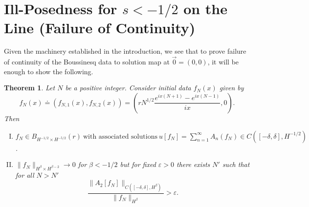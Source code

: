 \documentclass[12pt,reqno]{amsart}
\numberwithin{equation}{section}  %
\newcommand{\ee}{\varepsilon}
\newtheorem{theorem}{Theorem}[section]
\begin{document}
\section{Ill-Posedness for $s < -1/2$ on the Line (Failure of Continuity)} 
Given the machinery established in the introduction, we see that to prove failure of continuity of the Boussinesq data to solution map at $\vec{0} =
(0, 0)$, it will be enough to show the
following.
%
%
%
%
%
%
%
%
%
%
%
\begin{theorem}
  Let $N$ be a positive integer. Consider initial data $f_{N}(x)$ given by
  $$f_{N}(x) \doteq (f_{N,1}(x), f_{N,2}(x)) 
  = (r N^{1/2} \frac{e^{ix(N+1)} - e^{ix (N-1)}}{ix} , 0).$$
%
%
%
Then 
    \begin{enumerate}[(I)]
      \item{$ f_{N} \in B_{H^{-1/2} \times H^{-5/2}}(r) \ \text{with associated
    solutions}
    \ u[f_{N}] = \sum_{n=1}^{\infty} A_{n}(f_{N}) \in C([-\delta, \delta],
    H^{-1/2})$}.
    \\
  \item
    $\|f_{N}\|_{H^{\beta} \times H^{\beta-2}} \to 0$ for $\beta < -1/2$ but for fixed $\ee > 0$ there exists $N'$ such that for all $N > N'$ 
    $$  \frac{\|A_{2}[f_{N}]\|_{C( [-\delta, \delta], H^{\beta})}}{\| f_{N}
    \|_{H^{\beta}}} > \ee.$$
\end{enumerate}
\end{theorem}
%
%
%
\end{document}
